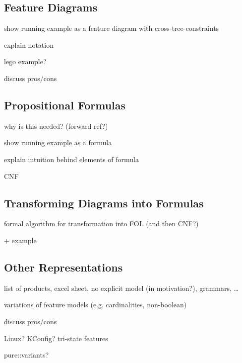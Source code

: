 \subsection{Feature Diagrams}

show running example as a feature diagram with cross-tree-constraints

explain notation

lego example?

discuss pros/cons

\subsection{Propositional Formulas}

why is this needed? (forward ref?)

show running example as a formula

explain intuition behind elements of formula

CNF

\subsection{Transforming Diagrams into Formulas}

formal algorithm for transformation into FOL (and then CNF?)

+ example

\subsection{Other Representations}

list of products, excel sheet, no explicit model (in motivation?), grammars, \dots

variations of feature models (e.g. cardinalities, non-boolean)

discuss pros/cons

Linux? KConfig? tri-state features

pure::variants?